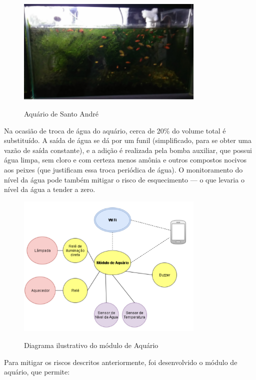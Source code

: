 \begin{figure}[H]
	\centering
	\caption{Aquário de Santo André}
	\includegraphics[width=0.8\textwidth]{aquario}
	\label{fig:aquario}
\end{figure}

Na ocasião de troca de água do aquário, cerca de 20\% do volume total é substituído. A saída de água se dá por um funil (simplificado, para se obter uma vazão de saída constante), e a adição é realizada pela bomba auxiliar, que possui água limpa, sem cloro e com certeza menos amônia e outros compostos nocivos aos peixes (que justificam essa troca periódica de água). O monitoramento do nível da água pode também mitigar o risco de esquecimento --- o que levaria o nível da água a tender a zero.

\begin{figure}[H]
	\centering
	\caption{Diagrama ilustrativo do módulo de Aquário}
	\includegraphics[width=0.8\textwidth]{diagramaAquario}
	\label{fig:diagramaAquario}
\end{figure}

Para mitigar os riscos descritos anteriormente, foi desenvolvido o módulo de aquário, que permite:

